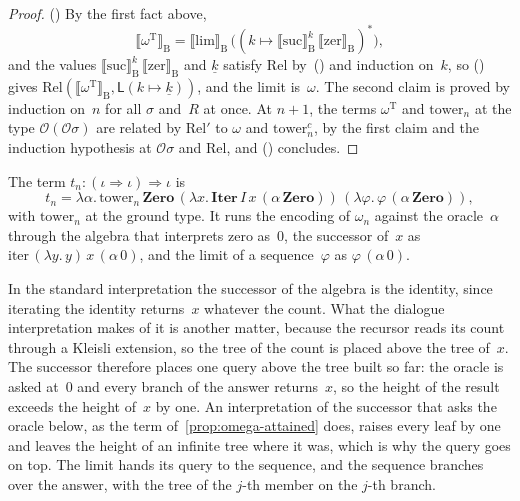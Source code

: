 \documentclass[11pt]{amsart}
\makeatletter
\newcommand{\Dial}{\mathrm{B}}
\newcommand{\Tm}{\mathrm{T}}
\newcommand{\gr}{\iota}                      %
\newcommand{\arr}{\Rightarrow}
\newcommand{\dsem}[1]{\llbracket #1 \rrbracket_{\Dial}}
\newcommand{\kext}[1]{#1^{*}}                %
\newcommand{\iterop}{\mathrm{iter}}
\newcommand{\Iterc}{\mathbf{Iter}}
\newcommand{\Zeroc}{\mathbf{Zero}}
\newcommand{\bL}{\mathsf{L}}
\newcommand{\num}[1]{\underline{#1}}          %
\newcommand{\tower}[1]{\omega_{#1}}           %
\newif\ifagdarefs
\newcommand{\AgdaRefs}[1]{\ifagdarefs{\footnotesize\color{agdablue}(#1)}\else\unskip\fi}
\newcommand{\Agda}[2]{{\footnotesize\color{agdablue}\textsf{#1}%
  \ifblank{#2}{}{\texttt{.}\allowbreak\texttt{#2}}}}
\let\ttt@plain\texttt
\renewcommand{\texttt}[1]{{\footnotesize\color{agdablue}\ttt@plain{#1}}}
\theoremstyle{plain}
\theoremstyle{definition}
\makeatother
\begin{document}
\begin{proof}
() By the first fact above,
\[
  \dsem{\omega^{\Tm}} = \dsem{\mathrm{lim}}\,\big(\kext{(k \mapsto
    \dsem{\mathrm{suc}}^{k}\,\dsem{\mathrm{zer}})}\big) ,
\]
and the values $\dsem{\mathrm{suc}}^{k}\,\dsem{\mathrm{zer}}$ and
$\num k$ satisfy $\mathrm{Rel}$ by~() and
induction on~$k$, so
() gives
$\mathrm{Rel}(\dsem{\omega^{\Tm}}, \bL(k \mapsto \num k))$, and the
limit is~$\omega$. The second claim is proved by induction on~$n$ for
all $\sigma$ and~$R$ at once. At $n+1$, the terms $\omega^{\Tm}$ and
$\mathrm{tower}_n$ at the type $\mathcal{O}(\mathcal{O}\sigma)$ are
related by $\mathrm{Rel}'$ to $\omega$ and $\mathrm{tower}^{c}_n$, by
the first claim and the induction hypothesis at
$\mathcal{O}\sigma$ and $\mathrm{Rel}$, and ()
concludes.
\end{proof}

\begin{definition}
\label{def:tower-term}
The term $t_{n} : (\gr\arr\gr)\arr\gr$ is
\[
  t_n = \lambda\alpha.\,\mathrm{tower}_n\,\Zeroc\,
    (\lambda x.\,\Iterc\,I\,x\,(\alpha\,\Zeroc))\,
    (\lambda\varphi.\,\varphi\,(\alpha\,\Zeroc)) ,
\]
with $\mathrm{tower}_n$ at the ground type. It runs the encoding of
$\tower n$ against the oracle~$\alpha$ through the algebra that
interprets zero as~$0$, the successor of~$x$ as
$\iterop\,(\lambda y.\,y)\,x\,(\alpha\,0)$, and the limit of a
sequence~$\varphi$ as $\varphi\,(\alpha\,0)$.
\AgdaRefs{\Agda{DialogueTrees.Sharpness}{tower-term}; \texttt{abs},
\texttt{tm}.}
\end{definition}

In the standard interpretation the successor of the algebra is the
identity, since iterating the identity returns~$x$ whatever the count.
What the dialogue interpretation makes of it is another matter,
because the recursor reads its count through a Kleisli extension, so
the tree of the count is placed above the tree of~$x$. The successor
therefore places one query above the tree built so far: the oracle is
asked at~$0$ and every branch of the answer returns~$x$, so the
height of the result exceeds the height of~$x$ by one. An
interpretation of the successor that asks the oracle below, as the
term of~\cref{prop:omega-attained} does, raises every leaf by one and
leaves the height of an infinite tree where it was, which is why the
query goes on top. The limit hands its query to the sequence, and the
sequence branches over the answer, with the tree of the $j$-th member
on the $j$-th branch.
\end{document}
